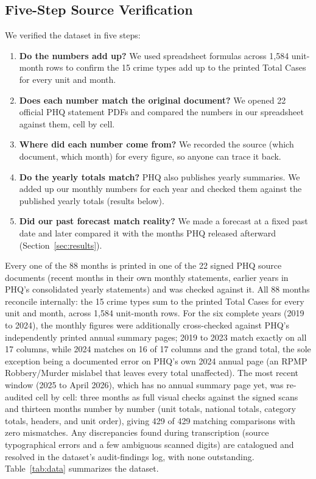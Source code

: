 \documentclass[conference]{IEEEtran}
\begin{document}
\subsection{Five-Step Source Verification}
We verified the dataset in five steps:
\begin{enumerate}
  \item \textbf{Do the numbers add up?} We used spreadsheet formulas across 1{,}584 unit-month rows to confirm
        the 15 crime types add up to the printed Total Cases for every unit and month.
  \item \textbf{Does each number match the original document?} We opened 22 official PHQ statement
        PDFs and compared the numbers in our spreadsheet against them, cell by cell.
  \item \textbf{Where did each number come from?} We recorded the source (which document, which
        month) for every figure, so anyone can trace it back.
  \item \textbf{Do the yearly totals match?} PHQ also publishes yearly summaries. We added up our
        monthly numbers for each year and checked them against the published yearly totals (results below).
  \item \textbf{Did our past forecast match reality?} We made a forecast at a fixed past date and
        later compared it with the months PHQ released afterward (Section~\ref{sec:results}).
\end{enumerate}
Every one of the 88 months is printed in one of the 22 signed PHQ source documents (recent months in their own monthly statements, earlier years in PHQ's consolidated yearly statements) and was checked against it. All 88 months
reconcile internally: the 15 crime types sum to the printed Total Cases for every unit and month,
across 1{,}584 unit-month rows. For the six complete years (2019 to 2024), the monthly figures were
additionally cross-checked against PHQ's independently printed annual summary pages; 2019 to 2023
match exactly on all 17 columns, while 2024 matches on 16 of 17 columns and the grand total, the
sole exception being a documented error on PHQ's own 2024 annual page (an RPMP Robbery/Murder
mislabel that leaves every total unaffected). The most recent window (2025 to April 2026), which
has no annual summary page yet, was re-audited cell by cell: three months as full visual checks
against the signed scans and thirteen months number by number (unit totals, national totals,
category totals, headers, and unit order), giving 429 of 429 matching comparisons with zero
mismatches. Any discrepancies found during transcription (source typographical errors and a few
ambiguous scanned digits) are catalogued and resolved in the dataset's audit-findings log, with
none outstanding. Table~\ref{tab:data} summarizes the dataset.
\end{document}
